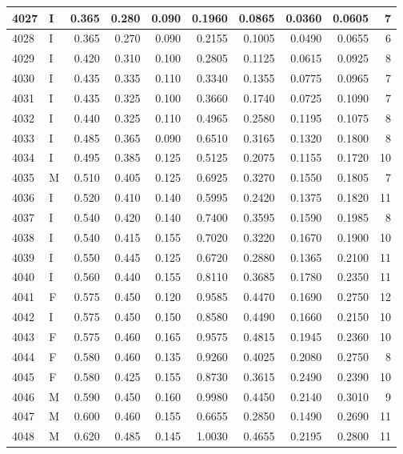 \documentclass[9pt,twocolumn,twoside,]{pnas-new}
\begin{document}
\begin{tabular}{l|l|r|r|r|r|r|r|r|r}
\hline
4027 & I & 0.365 & 0.280 & 0.090 & 0.1960 & 0.0865 & 0.0360 & 0.0605 & 7\\
\hline
4028 & I & 0.365 & 0.270 & 0.090 & 0.2155 & 0.1005 & 0.0490 & 0.0655 & 6\\
\hline
4029 & I & 0.420 & 0.310 & 0.100 & 0.2805 & 0.1125 & 0.0615 & 0.0925 & 8\\
\hline
4030 & I & 0.435 & 0.335 & 0.110 & 0.3340 & 0.1355 & 0.0775 & 0.0965 & 7\\
\hline
4031 & I & 0.435 & 0.325 & 0.100 & 0.3660 & 0.1740 & 0.0725 & 0.1090 & 7\\
\hline
4032 & I & 0.440 & 0.325 & 0.110 & 0.4965 & 0.2580 & 0.1195 & 0.1075 & 8\\
\hline
4033 & I & 0.485 & 0.365 & 0.090 & 0.6510 & 0.3165 & 0.1320 & 0.1800 & 8\\
\hline
4034 & I & 0.495 & 0.385 & 0.125 & 0.5125 & 0.2075 & 0.1155 & 0.1720 & 10\\
\hline
4035 & M & 0.510 & 0.405 & 0.125 & 0.6925 & 0.3270 & 0.1550 & 0.1805 & 7\\
\hline
4036 & I & 0.520 & 0.410 & 0.140 & 0.5995 & 0.2420 & 0.1375 & 0.1820 & 11\\
\hline
4037 & I & 0.540 & 0.420 & 0.140 & 0.7400 & 0.3595 & 0.1590 & 0.1985 & 8\\
\hline
4038 & I & 0.540 & 0.415 & 0.155 & 0.7020 & 0.3220 & 0.1670 & 0.1900 & 10\\
\hline
4039 & I & 0.550 & 0.445 & 0.125 & 0.6720 & 0.2880 & 0.1365 & 0.2100 & 11\\
\hline
4040 & I & 0.560 & 0.440 & 0.155 & 0.8110 & 0.3685 & 0.1780 & 0.2350 & 11\\
\hline
4041 & F & 0.575 & 0.450 & 0.120 & 0.9585 & 0.4470 & 0.1690 & 0.2750 & 12\\
\hline
4042 & I & 0.575 & 0.450 & 0.150 & 0.8580 & 0.4490 & 0.1660 & 0.2150 & 10\\
\hline
4043 & F & 0.575 & 0.460 & 0.165 & 0.9575 & 0.4815 & 0.1945 & 0.2360 & 10\\
\hline
4044 & F & 0.580 & 0.460 & 0.135 & 0.9260 & 0.4025 & 0.2080 & 0.2750 & 8\\
\hline
4045 & F & 0.580 & 0.425 & 0.155 & 0.8730 & 0.3615 & 0.2490 & 0.2390 & 10\\
\hline
4046 & M & 0.590 & 0.450 & 0.160 & 0.9980 & 0.4450 & 0.2140 & 0.3010 & 9\\
\hline
4047 & M & 0.600 & 0.460 & 0.155 & 0.6655 & 0.2850 & 0.1490 & 0.2690 & 11\\
\hline
4048 & M & 0.620 & 0.485 & 0.145 & 1.0030 & 0.4655 & 0.2195 & 0.2800 & 11\\

\end{tabular}
\end{document}
